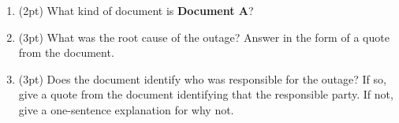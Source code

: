 \documentclass{report}
\newif\ifkey
\newcommand{\answershort}[1]{\ifkey\color{red}\underline{\textbf{#1}}\color{black}\else\underline{\hspace{3in}}\fi\xspace}
\newcommand{\answervvshort}[1]{\ifkey\color{red}\underline{\textbf{#1}}\color{black}\else\underline{\hspace{0.5in}}\fi\xspace}
\newcommand{\answerlong}[1]{\ifkey\color{red}\textbf{#1}\color{black}\else\vspace{0.5in}\fi\xspace}
\newcommand{\dbqpts}{30}
\newcommand*{\pts}[1]{\addtocounter{points}{#1}(#1pt)}
\begin{document}
\begin{spacing}{1.4}
\begin{enumerate}[leftmargin=*]
  \begin{lstlisting}[escapechar=\%]
def f(a, b, c) {
                   [ a -> %\answervvshort{T}%, b -> %\answervvshort{T}%, c -> %\answervvshort{T}%, d -> %\answervvshort{T}% ]
  if (*) {
                   [ a -> %\answervvshort{T}%, b -> %\answervvshort{T}%, c -> %\answervvshort{T}%, d -> %\answervvshort{T}% ]
    d = a + b;
                   [ a -> %\answervvshort{U}%, b -> %\answervvshort{U}%, c -> %\answervvshort{T}%, d -> %\answervvshort{T}% ]
  } else {
                   [ a -> %\answervvshort{T}%, b -> %\answervvshort{T}%, c -> %\answervvshort{T}%, d -> %\answervvshort{T}% ]
    d = a + c;
                   [ a -> %\answervvshort{U}%, b -> %\answervvshort{T}%, c -> %\answervvshort{U}%, d -> %\answervvshort{T}% ]
  }
                   [ a -> %\answervvshort{U}%, b -> %\answervvshort{T}%, c -> %\answervvshort{T}%, d -> %\answervvshort{T}% ]
  return d;
                   [ a -> %\answervvshort{U}%, b -> %\answervvshort{T}%, c -> %\answervvshort{T}%, d -> %\answervvshort{U}% ]
}
  \end{lstlisting}

    \newpage
    \textbf{IV. Document-based Questions (\dbqpts pts).} All questions in this section refer to a documents \textbf{A-B}.
    These documents appear at the end of the exam (I recommend that you tear them out and refer to them as you answer the questions).

    Questions on this page concern \textbf{Document A}.
    
    \item \pts{2} What kind of document is \textbf{Document A}? \\ \answershort{postmortem}

    \item \pts{3} What was the root cause of the outage? Answer in the form of a quote
      from the document.\\ \answerlong{``one of the inputs to the command was entered incorrectly''}

    \item \pts{3} Does the document identify who was responsible for the outage? If so, give a quote
      from the document identifying that the responsible party. If not, give a one-sentence explanation
      for why not.\\
      \answerlong{The document does not identify who was responsible, because this is a blameless postmortem:
        it blames the system, rather than the individual. (Any answer with ``blameless'' or a synonym will probably be accepted.)}


\end{enumerate}
\end{spacing}
\end{document}
